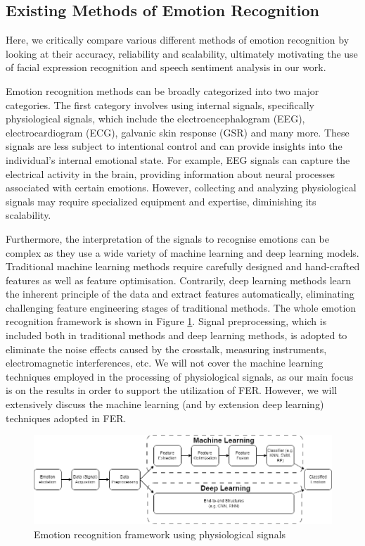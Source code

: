 \documentclass[12pt, a4paper]{article}
\newcommand{\np}
    {
    \vskip 0.4cm
    }
\begin{document}
\subsection{Existing Methods of Emotion Recognition}

Here, we critically compare various different methods of emotion recognition by looking at their accuracy, reliability and scalability, ultimately motivating the use of facial expression recognition and speech sentiment analysis in our work. 
\np
Emotion recognition methods can be broadly categorized into two major categories. The first category involves using internal signals, specifically physiological signals, which include the electroencephalogram (EEG), electrocardiogram (ECG), galvanic skin response (GSR) and many more. These signals are less subject to intentional control and can provide insights into the individual's internal emotional state. For example, EEG signals can capture the electrical activity in the brain, providing information about neural processes associated with certain emotions. However, collecting and analyzing physiological signals may require specialized equipment and expertise, diminishing its scalability. 
\np
Furthermore, the interpretation of the signals to recognise emotions can be complex as they use a wide variety of machine learning and deep learning models. Traditional machine learning methods require carefully designed and hand-crafted features as well as feature optimisation. Contrarily, deep learning methods learn the inherent principle of the data and extract features automatically, eliminating challenging feature engineering stages of traditional methods. The whole emotion recognition framework is shown in Figure \ref{fig:physioprocess}. Signal preprocessing, which is included both in traditional methods and deep learning methods, is adopted to eliminate the noise effects caused by the crosstalk, measuring instruments, electromagnetic interferences, etc. We will not cover the machine learning techniques employed in the processing of physiological signals, as our main focus is on the results in order to support the utilization of FER. However, we will extensively discuss the machine learning (and by extension deep learning) techniques adopted in FER.

\begin{figure}[H]
    \centering
    \includegraphics[scale=0.46]{diagrams/physioprocess.png}
    \caption{Emotion recognition framework using physiological signals}
    \label{fig:physioprocess}
\end{figure}
\end{document}
